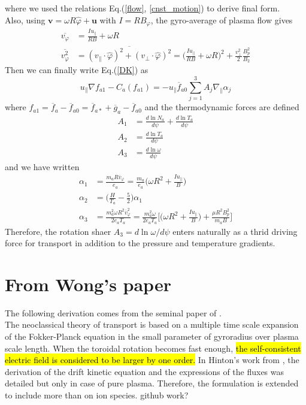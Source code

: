 where we used the relations Eq.(\ref{flow}, \ref{cnst_motion}) to derive final form. \\
Also, using $\bm{v}=\omega R \hat{\varphi} + \bm{u}$ with $I=RB_\varphi$, the gyro-average of plasma flow gives 
\begin{align}
    \overbar{v_\varphi} &= \frac{I u_\parallel}{RB} + \omega R \nonumber \\
    \overbar{v_\varphi^2} &= \overbar{(v_\parallel \cdot \hat{\varphi})^2 + (v_\perp \cdot \hat{\varphi})^2} = \Big(\frac{I u_\parallel}{RB}+\omega R \Big)^2 + \frac{v_\perp^2}{2}\frac{B_p^2}{B_2}
\end{align}
Then we can finally write Eq.(\ref{DK}) as 
\begin{equation}
    u_\parallel \nabla f_{a1} - C_a(f_{a1}) = -u_\parallel \overbar{f}_{a0}\sum_{j=1}^3 A_j \nabla_\parallel \alpha_j
\end{equation}
where $f_{a1}=\overbar{f}_a-\overbar{f}_{a0}=\overbar{f}_{a*}+\overbar{g}_a-\overbar{f}_{a0}$ and the thermodynamic forces are defined
\begin{align}
    A_1 &= \frac{d\ln{N_a}}{d\psi} + \frac{d\ln{T_a}}{d\psi} \\
    A_2 &= \frac{d\ln{T_a}}{d\psi} \\
    A_3 &= \frac{d\ln{\omega}}{d\psi}
\end{align}
and we have written
\begin{align}
    \alpha_1 &=\frac{m_a R \overbar{v}_\varphi}{e_a} = \frac{m_a}{e_a}\Big(\omega R^2 + \frac{I u_\parallel}{B}\Big) \\
    \alpha_2 &= \big (\frac{H}{T_a}-\frac{5}{2}\Big)\alpha_1 \\
    \alpha_3 &= \frac{m_a^2 \omega R^2 \overbar{v}_\varphi^2}{2e_aT_a} = \frac{m_a^2 \omega}{2 e_a T_a}\Bigg[\Big(\omega R^2 + \frac{I u_\parallel}{B}\Big) + \frac{\mu R^2 B_p^2}{m_a B}\Bigg]
\end{align}
Therefore, the rotation shaer $A_3=d\ln{\omega}/d\psi$ enters naturally as a thrid driving force for transport in addition to the pressure and temperature gradients.

\section{From Wong's paper}
The following derivation comes from the seminal paper of \citep{Wong87}. \\
The neoclassical theory of transport is based on a multiple time scale expansion of the Fokker-Planck equation in the small parameter of gyroradius over plasma scale length. When the toroidal rotation becomes fast enough, \hl{the self-consistent electric field is considered to be larger by one order.} In Hinton's work from \citep{Hinton85}, the derivation of the drift kinetic equation and the expressions of the fluxes was detailed but only in case of pure plasma. Therefore, the formulation is extended to include more than on ion species. github work?
